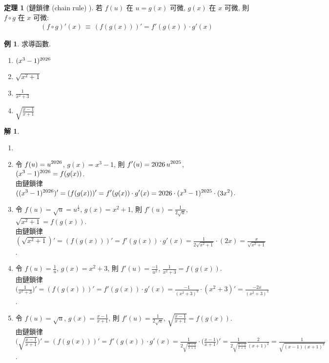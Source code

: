 \documentclass[12pt]{extarticle}
\newcommand{\ds}{\displaystyle}
\theoremstyle{definition}
\newtheorem*{thm}{定理}
\newtheorem*{ex}{例}
\newtheorem*{sol}{解}
\def\theyear{\the\year}
\begin{document}
\begin{thm}[鏈鎖律 (chain rule) ]
  若 $f(u)$ 在 $u = g(x)$ 可微, $g(x)$ 在 $x$ 可微, 則 $f\circ g$ 在 $x$ 可微: 
  \begin{align*}
    (f\circ g)'(x)\,\equiv\,(f(g(x)))' = f'(g(x))\cdot g'(x)
  \end{align*}
\end{thm}

\begin{ex} 求導函數.
  \begin{multicols}{4}
    \begin{enumerate}\setlength\itemsep{0em}
      \item $(x^3 - 1)^{\theyear}$
      \item $\sqrt{x^2 + 1}$
      \item $\frac{1}{x^2 + 3}$
      \item $\sqrt{\frac{x - 1}{x + 1}}$
    \end{enumerate}
  \end{multicols}
\end{ex}

\begin{sol}
  \begin{enumerate}\setlength\itemsep{0em}
    \item[]
    \item 令 $\ds f(u) = u^{\theyear}$, $g(x) = x^3 - 1$, 則 $\ds f'(u) = \theyear\,u^{\the\numexpr\theyear-1\relax}$, $\ds(x^3 - 1)^{\theyear} = f(g(x))$. \\由鏈鎖律 $\ds((x^3 - 1)^{\theyear})' = (f(g(x)))' = f'(g(x))\cdot g'(x) = \theyear\cdot(x^3 - 1)^{\the\numexpr\theyear-1\relax}\cdot(3x^2)$. 
    \item 令 $\ds f(u) = \sqrt{u} = u^{\frac{1}{2}}$, $g(x) = x^2 + 1$, 則 $\ds f'(u) = \frac{1}{2\sqrt{u}}$, $\ds\sqrt{x^2 + 1} = f(g(x))$. \\由鏈鎖律 $\ds (\sqrt{x^2 + 1})' = (f(g(x)))' = f'(g(x))\cdot g'(x) = \frac{1}{2\sqrt{x^2 + 1}}\cdot(2x) = \frac{x}{\sqrt{x^2 + 1}}$. 
    \item 令 $\ds f(u) = \frac{1}{u}$, $g(x) = x^2 + 3$, 則 $\ds f'(u) = \frac{-1}{u^2}$, $\ds\frac{1}{x^2 + 3} = f(g(x))$. \\由鏈鎖律 $\ds\Big(\frac{1}{x^2 + 3}\Big)' = (f(g(x)))' = f'(g(x))\cdot g'(x) = \frac{-1}{(x^2 + 3)^2}\cdot(x^2 + 3)' = \frac{-2x}{(x^2 + 3)^2}$. 
    \item 令 $\ds f(u) = \sqrt{u}$, $\ds g(x) = \frac{x - 1}{x + 1}$, 則 $\ds f'(u) = \frac{1}{2\sqrt{u}}$, $\ds\sqrt{\frac{x - 1}{x + 1}} = f(g(x))$. \\由鏈鎖律 $\ds\bigg(\sqrt{\frac{x - 1}{x + 1}}\bigg)' = (f(g(x)))' = f'(g(x))\cdot g'(x) = \frac{1}{2\sqrt{\frac{x - 1}{x + 1}}}\cdot\Big(\frac{x - 1}{x + 1}\Big)' = \frac{1}{2\sqrt{\frac{x - 1}{x + 1}}}\frac{2}{(x + 1)^2} = \frac{1}{\sqrt{(x - 1)(x + 1)^3}}$. 
  \end{enumerate}
\end{sol}
\end{document}
